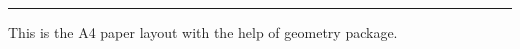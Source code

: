 \documentclass{article}
\begin{document}
\noindent\rule{\textwidth}{1pt}
    This is the A4 paper layout with the help of geometry package.
\end{document}

